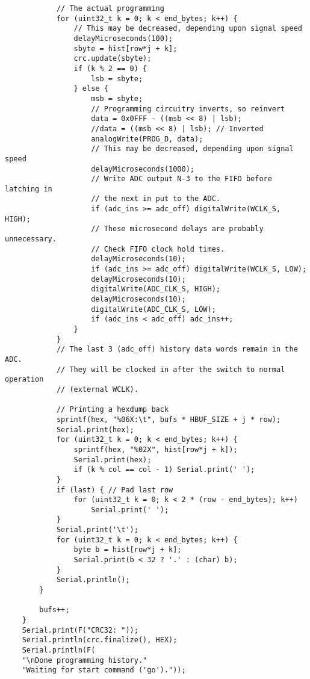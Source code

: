 \documentclass[11pt,letterpaper]{article}
\begin{document}
\begin{verbatim}
            // The actual programming
            for (uint32_t k = 0; k < end_bytes; k++) {
                // This may be decreased, depending upon signal speed
                delayMicroseconds(100);
                sbyte = hist[row*j + k];
                crc.update(sbyte);
                if (k % 2 == 0) {
                    lsb = sbyte;
                } else {
                    msb = sbyte;
                    // Programming circuitry inverts, so reinvert
                    data = 0x0FFF - ((msb << 8) | lsb);
                    //data = ((msb << 8) | lsb); // Inverted
                    analogWrite(PROG_D, data);
                    // This may be decreased, depending upon signal speed
                    delayMicroseconds(1000);
                    // Write ADC output N-3 to the FIFO before latching in
                    // the next in put to the ADC.
                    if (adc_ins >= adc_off) digitalWrite(WCLK_S, HIGH);
                    // These microsecond delays are probably unnecessary.
                    // Check FIFO clock hold times.
                    delayMicroseconds(10);
                    if (adc_ins >= adc_off) digitalWrite(WCLK_S, LOW);
                    delayMicroseconds(10);
                    digitalWrite(ADC_CLK_S, HIGH);
                    delayMicroseconds(10);
                    digitalWrite(ADC_CLK_S, LOW);
                    if (adc_ins < adc_off) adc_ins++;
                }
            }
            // The last 3 (adc_off) history data words remain in the ADC.
            // They will be clocked in after the switch to normal operation
            // (external WCLK).

            // Printing a hexdump back
            sprintf(hex, "%06X:\t", bufs * HBUF_SIZE + j * row);
            Serial.print(hex);
            for (uint32_t k = 0; k < end_bytes; k++) {
                sprintf(hex, "%02X", hist[row*j + k]);
                Serial.print(hex);
                if (k % col == col - 1) Serial.print(' ');
            }
            if (last) { // Pad last row
                for (uint32_t k = 0; k < 2 * (row - end_bytes); k++)
                    Serial.print(' ');
            }
            Serial.print('\t');
            for (uint32_t k = 0; k < end_bytes; k++) {
                byte b = hist[row*j + k];
                Serial.print(b < 32 ? '.' : (char) b);
            }
            Serial.println();
        }

        bufs++;
    }
    Serial.print(F("CRC32: "));
    Serial.println(crc.finalize(), HEX);
    Serial.println(F(
    "\nDone programming history."
    "Waiting for start command ('go')."));


\end{verbatim}
\end{document}
